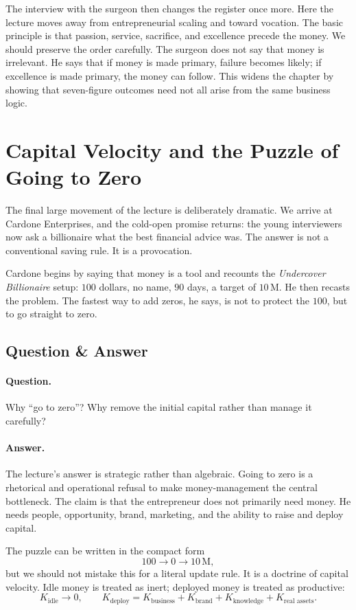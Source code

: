 The interview with the surgeon then changes the register once more. Here the lecture moves away from entrepreneurial scaling and toward vocation. The basic principle is that passion, service, sacrifice, and excellence precede the money. We should preserve the order carefully. The surgeon does not say that money is irrelevant. He says that if money is made primary, failure becomes likely; if excellence is made primary, the money can follow. This widens the chapter by showing that seven-figure outcomes need not all arise from the same business logic.

\section{Capital Velocity and the Puzzle of Going to Zero}

The final large movement of the lecture is deliberately dramatic. We arrive at Cardone Enterprises, and the cold-open promise returns: the young interviewers now ask a billionaire what the best financial advice was. The answer is not a conventional saving rule. It is a provocation.

Cardone begins by saying that money is a tool and recounts the \emph{Undercover Billionaire} setup: \(100\) dollars, no name, \(90\) days, a target of \(10\,\mathrm{M}\). He then recasts the problem. The fastest way to add zeros, he says, is not to protect the \(100\), but to go straight to zero.

\subsection{Question \& Answer}

\paragraph{Question.}
Why ``go to zero''? Why remove the initial capital rather than manage it carefully?

\paragraph{Answer.}
The lecture's answer is strategic rather than algebraic. Going to zero is a rhetorical and operational refusal to make money-management the central bottleneck. The claim is that the entrepreneur does not primarily need money. He needs people, opportunity, brand, marketing, and the ability to raise and deploy capital.

The puzzle can be written in the compact form
\begin{equation}
100 \longrightarrow 0 \longrightarrow 10\,\mathrm{M},
\end{equation}
but we should not mistake this for a literal update rule. It is a doctrine of capital velocity. Idle money is treated as inert; deployed money is treated as productive:
\begin{equation}
K_{\text{idle}} \rightarrow 0,
\qquad
K_{\text{deploy}}
=
K_{\text{business}}
+
K_{\text{brand}}
+
K_{\text{knowledge}}
+
K_{\text{real assets}}.
\end{equation}

